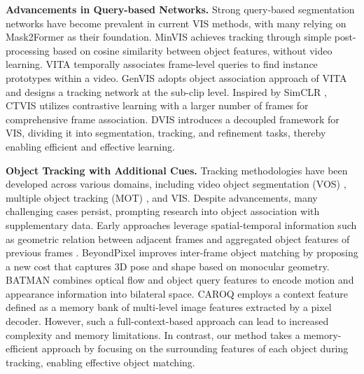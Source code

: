 \documentclass[10pt,twocolumn,letterpaper]{article}
\begin{document}

\textbf{Advancements in Query-based Networks.}
Strong query-based segmentation networks have become prevalent in current VIS methods, with many relying on Mask2Former \citep{cheng2022masked} as their foundation.
MinVIS \citep{huang2022minvis} achieves tracking through simple post-processing based on cosine similarity between object features, without video learning.
VITA \citep{heo2022vita} temporally associates frame-level queries to find instance prototypes within a video.
GenVIS \citep{heo2023generalized} adopts object association approach of VITA and designs a tracking network at the sub-clip level.
Inspired by SimCLR \citep{chen2020simple}, CTVIS \citep{ying2023ctvis} utilizes contrastive learning with a larger number of frames for comprehensive frame association.
DVIS \citep{DVIS} introduces a decoupled framework for VIS, dividing it into segmentation, tracking, and refinement tasks, thereby enabling efficient and effective learning.



\noindent\textbf{Object Tracking with Additional Cues.} 
Tracking methodologies have been developed across various domains, including video object segmentation (VOS) \citep{xu2018youtube, oh2019video, cheng2021rethinking}, multiple object tracking (MOT) \citep{milan2016mot16, bergmann2019tracking, zhou2020tracking, zhang2021fairmot}, and VIS.
Despite advancements, many challenging cases persist, prompting research into object association with supplementary data.
Early approaches leverage spatial-temporal information such as geometric relation between adjacent frames \citep{tang2017multiple} and aggregated object features of previous frames \citep{xu2019spatial}.
BeyondPixel \citep{sharma2018beyond} improves inter-frame object matching by proposing a new cost that captures 3D pose and shape based on monocular geometry. 
BATMAN \citep{yu2022batman} combines optical flow and object query features to encode motion and appearance information into bilateral space.
CAROQ \citep{Choudhuri_2023_CVPR} employs a context feature defined as a memory bank of multi-level image features extracted by a pixel decoder. However, such a full-context-based approach can lead to increased complexity and memory limitations. In contrast, our method takes a memory-efficient approach by focusing on the surrounding features of each object during tracking, enabling effective object matching.
\end{document}
